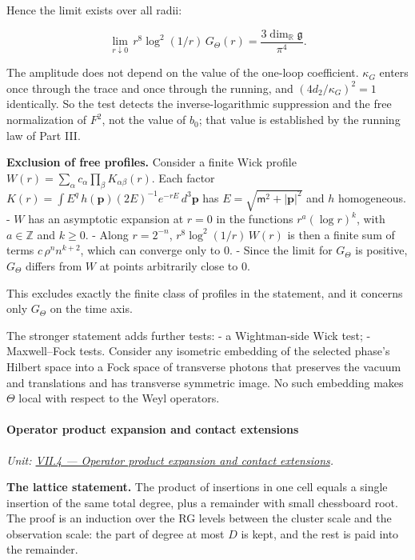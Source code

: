 \documentclass[
  letterpaper,
  11pt]{article}
\begin{document}
Hence the limit exists over all radii:

\[\lim_{r\downarrow0}\,r^8\log^2(1/r)\,G_\Theta(r)=\frac{3\dim_{\mathbb R}\mathfrak g}{\pi^4}.\]

The amplitude does not depend on the value of the one-loop coefficient.
\(\kappa_G\) enters once through the trace and once through the running,
and \((4d_2/\kappa_G)^2=1\) identically. So the test detects the
inverse-logarithmic suppression and the free normalization of \(F^2\),
not the value of \(b_0\); that value is established by the running law
of Part III.

\textbf{Exclusion of free profiles.} Consider a finite Wick profile
\(W(r)=\sum_\alpha c_\alpha\prod_\beta K_{\alpha\beta}(r)\). Each factor
\(K(r)=\int E^q\,h(\mathbf p)(2E)^{-1}e^{-rE}\,d^3\mathbf p\) has
\(E=\sqrt{\mathsf m^2+|\mathbf p|^2}\) and \(h\) homogeneous. - \(W\)
has an asymptotic expansion at \(r=0\) in the functions
\(r^a(\log r)^k\), with \(a\in\mathbb Z\) and \(k\ge0\). - Along
\(r=2^{-n}\), \(r^8\log^2(1/r)\,W(r)\) is then a finite sum of terms
\(c\,\rho^n n^{k+2}\), which can converge only to \(0\). - Since the
limit for \(G_\Theta\) is positive, \(G_\Theta\) differs from \(W\) at
points arbitrarily close to \(0\).

This excludes exactly the finite class of profiles in the statement, and
it concerns only \(G_\Theta\) on the time axis.

The stronger statement adds further tests: - a Wightman-side Wick test;
- Maxwell--Fock tests. Consider any isometric embedding of the selected
phase's Hilbert space into a Fock space of transverse photons that
preserves the vacuum and translations and has transverse symmetric
image. No such embedding makes \(\Theta\) local with respect to the Weyl
operators.

\paragraph{Operator product expansion and contact
extensions}\label{operator-product-expansion-and-contact-extensions}

\emph{Unit:
\href{https://github.com/scottnarmstrong/yang-mills-informalization/blob/main/outline/units/VII-4.md}{VII.4
--- Operator product expansion and contact extensions}.}

\textbf{The lattice statement.} The product of insertions in one cell
equals a single insertion of the same total degree, plus a remainder
with small chessboard root. The proof is an induction over the RG levels
between the cluster scale and the observation scale: the part of degree
at most \(D\) is kept, and the rest is paid into the remainder.
\end{document}
